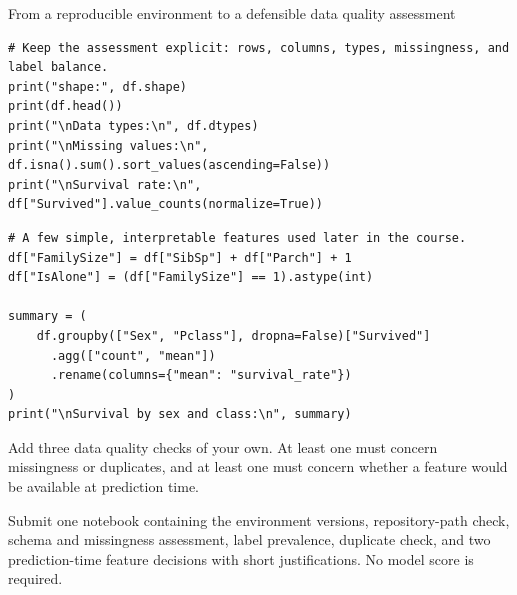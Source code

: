 \begin{labproject}{From a reproducible environment to a defensible data quality assessment}
\begin{lstlisting}[style=mlpython]
# Keep the assessment explicit: rows, columns, types, missingness, and label balance.
print("shape:", df.shape)
print(df.head())
print("\nData types:\n", df.dtypes)
print("\nMissing values:\n", df.isna().sum().sort_values(ascending=False))
print("\nSurvival rate:\n", df["Survived"].value_counts(normalize=True))
\end{lstlisting}

\begin{lstlisting}[style=mlpython]
# A few simple, interpretable features used later in the course.
df["FamilySize"] = df["SibSp"] + df["Parch"] + 1
df["IsAlone"] = (df["FamilySize"] == 1).astype(int)

summary = (
    df.groupby(["Sex", "Pclass"], dropna=False)["Survived"]
      .agg(["count", "mean"])
      .rename(columns={"mean": "survival_rate"})
)
print("\nSurvival by sex and class:\n", summary)
\end{lstlisting}

\begin{tryit}
Add three data quality checks of your own. At least one must concern missingness or duplicates, and at least one must concern whether a feature would be available at prediction time.
\end{tryit}
\end{labproject}

\begin{labdeliverable}
Submit one notebook containing the environment versions, repository-path check, schema and missingness assessment, label prevalence, duplicate check, and two prediction-time feature decisions with short justifications. No model score is required.
\end{labdeliverable}
